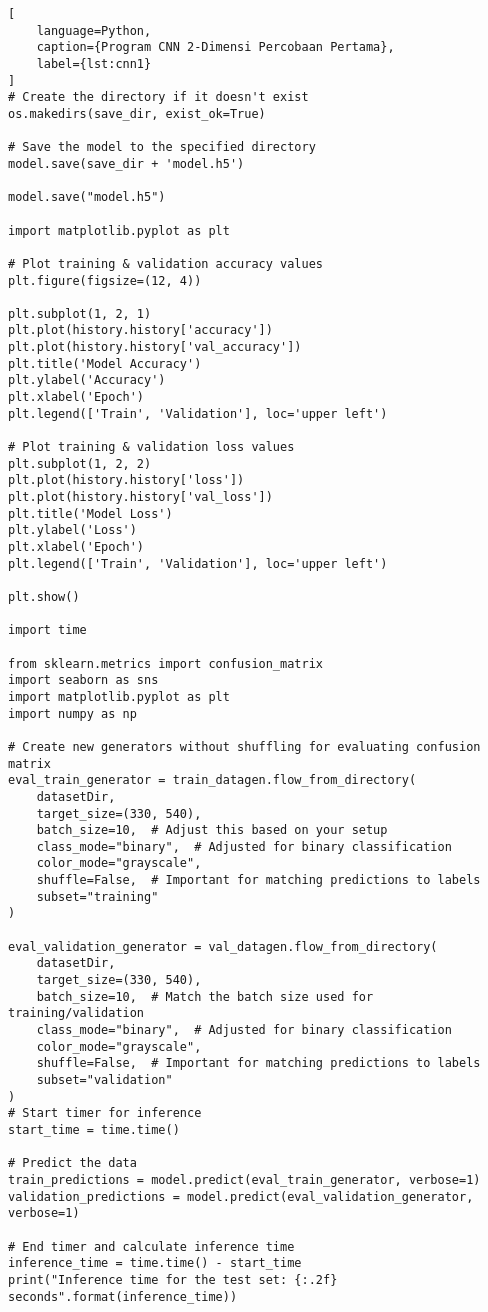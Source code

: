 \begin{lstlisting}[
    language=Python,
    caption={Program CNN 2-Dimensi Percobaan Pertama},
    label={lst:cnn1}
]
# Create the directory if it doesn't exist
os.makedirs(save_dir, exist_ok=True)

# Save the model to the specified directory
model.save(save_dir + 'model.h5')

model.save("model.h5")

import matplotlib.pyplot as plt

# Plot training & validation accuracy values
plt.figure(figsize=(12, 4))

plt.subplot(1, 2, 1)
plt.plot(history.history['accuracy'])
plt.plot(history.history['val_accuracy'])
plt.title('Model Accuracy')
plt.ylabel('Accuracy')
plt.xlabel('Epoch')
plt.legend(['Train', 'Validation'], loc='upper left')

# Plot training & validation loss values
plt.subplot(1, 2, 2)
plt.plot(history.history['loss'])
plt.plot(history.history['val_loss'])
plt.title('Model Loss')
plt.ylabel('Loss')
plt.xlabel('Epoch')
plt.legend(['Train', 'Validation'], loc='upper left')

plt.show()

import time

from sklearn.metrics import confusion_matrix
import seaborn as sns
import matplotlib.pyplot as plt
import numpy as np

# Create new generators without shuffling for evaluating confusion matrix
eval_train_generator = train_datagen.flow_from_directory(
    datasetDir,
    target_size=(330, 540),
    batch_size=10,  # Adjust this based on your setup
    class_mode="binary",  # Adjusted for binary classification
    color_mode="grayscale",
    shuffle=False,  # Important for matching predictions to labels
    subset="training"
)

eval_validation_generator = val_datagen.flow_from_directory(
    datasetDir,
    target_size=(330, 540),
    batch_size=10,  # Match the batch size used for training/validation
    class_mode="binary",  # Adjusted for binary classification
    color_mode="grayscale",
    shuffle=False,  # Important for matching predictions to labels
    subset="validation"
)
# Start timer for inference
start_time = time.time()

# Predict the data
train_predictions = model.predict(eval_train_generator, verbose=1)
validation_predictions = model.predict(eval_validation_generator, verbose=1)

# End timer and calculate inference time
inference_time = time.time() - start_time
print("Inference time for the test set: {:.2f} seconds".format(inference_time))


\end{lstlisting}
